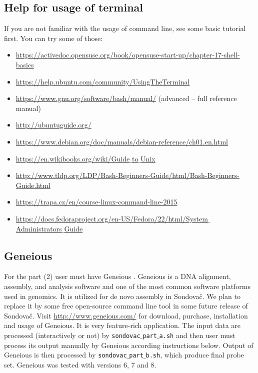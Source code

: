 \documentclass[a4paper, 11pt, twoside]{article}
\begin{document}
\subsection{Help for usage of terminal}

If you are not familiar with the usage of command line, see some basic tutorial first. You can try some of those:

\begin{itemize}
  \item \href{https://activedoc.opensuse.org/book/opensuse-start-up/chapter-17-shell-basics}{https://activedoc.opensuse.org/book/opensuse-start-up/chapter-17-shell-basics}
  \item \href{https://help.ubuntu.com/community/UsingTheTerminal}{https://help.ubuntu.com/community/UsingTheTerminal}
  \item \href{https://www.gnu.org/software/bash/manual/}{https://www.gnu.org/software/bash/manual/} (advanced -- full reference manual)
  \item \href{http://ubuntuguide.org/}{http://ubuntuguide.org/}
  \item \href{https://www.debian.org/doc/manuals/debian-reference/ch01.en.html}{https://www.debian.org/doc/manuals/debian-reference/ch01.en.html}
  \item \href{https://en.wikibooks.org/wiki/Guide_to_Unix}{https://en.wikibooks.org/wiki/Guide$\_$to$\_$Unix}
  \item \href{http://www.tldp.org/LDP/Bash-Beginners-Guide/html/Bash-Beginners-Guide.html}{http://www.tldp.org/LDP/Bash-Beginners-Guide/html/Bash-Beginners-Guide.html}
  \item \href{https://trapa.cz/en/course-linux-command-line-2015}{https://trapa.cz/en/course-linux-command-line-2015}
  \item \href{https://docs.fedoraproject.org/en-US/Fedora/22/html/System_Administrators_Guide}{https://docs.fedoraproject.org/en-US/Fedora/22/html/System$\_$Administrators$\_$Guide}
\end{itemize}

\subsection{Geneious}
\label{geneious}

For the part (2) user must have Geneious \citep{Kearse2012}. Geneious is a DNA alignment, assembly, and analysis software and one of the most common software platforms used in genomics. It is utilized for de novo assembly in Sondovač. We plan to replace it by some free open-source command line tool in some future release of Sondovač. Visit \href{http://www.geneious.com/}{http://www.geneious.com/} for download, purchase, installation and usage of Geneious. It is very feature-rich application. The input data are processed (interactively or not) by \texttt{sondovac$\_$part$\_$a.sh} and then user must process its output manually by Geneious according instructions below. Output of Geneious is then processed by \texttt{sondovac$\_$part$\_$b.sh}, which produce final probe set. Geneious was tested with versions 6, 7 and 8.
\end{document}
